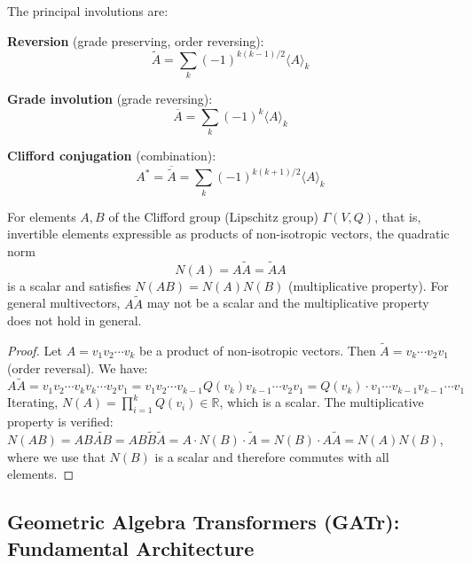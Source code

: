 \begin{definition}\label{def:involuciones_clifford}
The principal involutions are:

\textbf{Reversion} (grade preserving, order reversing):
\begin{equation}
    \widetilde{A} = \sum_k (-1)^{k(k-1)/2} \langle A \rangle_k
\end{equation}

\textbf{Grade involution} (grade reversing):
\begin{equation}
    \overline{A} = \sum_k (-1)^k \langle A \rangle_k
\end{equation}

\textbf{Clifford conjugation} (combination):
\begin{equation}
    A^* = \overline{\widetilde{A}} = \sum_k (-1)^{k(k+1)/2} \langle A \rangle_k
\end{equation}
\end{definition}

\begin{proposition}\label{prop:norma_clifford}
For elements $A, B$ of the Clifford group (Lipschitz group) $\Gamma(V,Q)$, that is, invertible elements expressible as products of non-isotropic vectors, the quadratic norm
\begin{equation}
    N(A) = A \widetilde{A} = \widetilde{A} A
\end{equation}
is a scalar and satisfies $N(AB) = N(A)N(B)$ (multiplicative property). For general multivectors, $A\widetilde{A}$ may not be a scalar and the multiplicative property does not hold in general.
\end{proposition}

\begin{proof}
Let $A = v_1 v_2 \cdots v_k$ be a product of non-isotropic vectors. Then $\widetilde{A} = v_k \cdots v_2 v_1$ (order reversal). We have:
\[
A\widetilde{A} = v_1 v_2 \cdots v_k v_k \cdots v_2 v_1 = v_1 v_2 \cdots v_{k-1} Q(v_k) v_{k-1} \cdots v_2 v_1 = Q(v_k) \cdot v_1 \cdots v_{k-1} v_{k-1} \cdots v_1
\]
Iterating, $N(A) = \prod_{i=1}^k Q(v_i) \in \mathbb{R}$, which is a scalar. The multiplicative property is verified: $N(AB) = AB\widetilde{AB} = AB\widetilde{B}\widetilde{A} = A \cdot N(B) \cdot \widetilde{A} = N(B) \cdot A\widetilde{A} = N(A)N(B)$, where we use that $N(B)$ is a scalar and therefore commutes with all elements.
\end{proof}

\subsection{Geometric Algebra Transformers (GATr): Fundamental Architecture}

